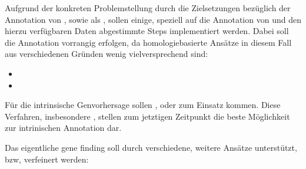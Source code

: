 Aufgrund der konkreten Problemstellung durch die Zielsetzungen bezüglich der
Annotation von , sowie als ,
sollen einige, speziell auf die Annotation von  und den
hierzu verfügbaren Daten abgestimmte Steps implementiert werden.
Dabei soll die Annotation vorrangig  
erfolgen, da homologiebasierte Ansätze in diesem Fall aus verschiedenen Gründen
wenig vielversprechend sind:
\begin{itemize}
\item {}
\item {}
\end{itemize}
Für die intrinsische Genvorhersage sollen  , oder   zum
Einsatz kommen.
Diese Verfahren, insbesondere , stellen zum
jetztigen Zeitpunkt die beste Möglichkeit zur intrinischen Annotation dar.

Das eigentliche gene finding soll durch verschiedene, weitere Ansätze
unterstützt, bzw, verfeinert werden:


 
